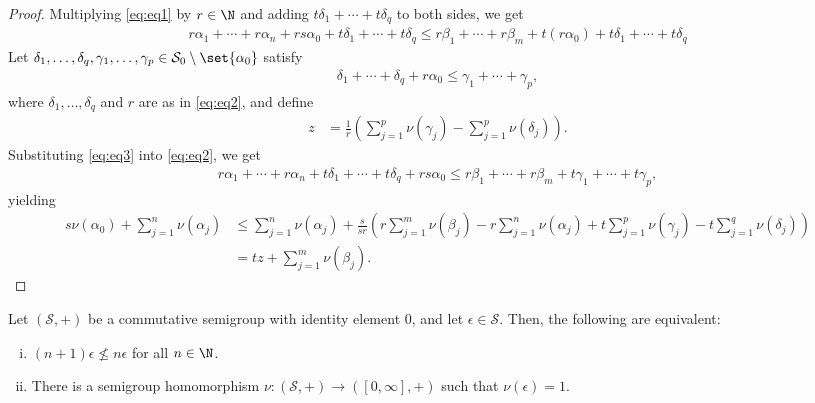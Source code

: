 \documentclass[10pt]{mypackage}
\begin{document}
\begin{proof}
    Multiplying \ref{eq:eq1} by $r\in \N$ and adding $t\delta_1 + \cdots + t\delta_q$ to both sides, we get
    \begin{align*}
      r\alpha_1 + \cdots + r\alpha_n + rs\alpha_0 + t\delta_1 + \cdots + t\delta_q \leq r\beta_1 + \cdots + r\beta_m + t\left(r\alpha_0\right) + t\delta_1 + \cdots + t\delta_q\label{eq:eq2}\tag{\textasteriskcentered\textasteriskcentered}
    \end{align*}
    Let $\delta_1,\dots,\delta_q,\gamma_1,\dots,\gamma_p\in \mathcal{S}_0\setminus \set{\alpha_0}$ satisfy
    \begin{align*}
      \delta_1 +\cdots + \delta_q + r\alpha_0 \leq \gamma_1 + \cdots + \gamma_p, \label{eq:eq3}\tag{\textasteriskcentered\textasteriskcentered\textasteriskcentered}
    \end{align*}
    where $\delta_1,\dots,\delta_q$ and $r$ are as in \ref{eq:eq2}, and define
    \begin{align*}
      z &= \frac{1}{r} \left(\sum_{j=1}^{p}\nu\left(\gamma_j\right) - \sum_{j=1}^{p}\nu\left(\delta_j\right)\right).
    \end{align*}
    Substituting \ref{eq:eq3} into \ref{eq:eq2}, we get
    \begin{align*}
      r\alpha_1 + \cdots + r\alpha_n + t\delta_1 + \cdots + t\delta_q + rs\alpha_0 \leq r\beta_1 + \cdots + r\beta_m + t\gamma_1 + \cdots + t\gamma_p,
    \end{align*}
    yielding
    \begin{align*}
      s\nu\left(\alpha_0\right) + \sum_{j=1}^{n}\nu\left(\alpha_j\right) &\leq \sum_{j=1}^{n}\nu\left(\alpha_j\right) + \frac{s}{sr}\left(r\sum_{j=1}^{m}\nu\left(\beta_j\right) - r\sum_{j=1}^{n}\nu\left(\alpha_j\right) + t\sum_{j=1}^{p}\nu\left(\gamma_j\right) -t\sum_{j=1}^{q}\nu\left(\delta_j\right)\right)\\
                                                                         &= tz + \sum_{j=1}^{m}\nu\left(\beta_j\right).
    \end{align*}
  \end{proof}
  \begin{theorem}
    Let $\left(\mathcal{S},+\right)$ be a commutative semigroup with identity element $0$, and let $\epsilon \in \mathcal{S}$. Then, the following are equivalent:
    \begin{enumerate}[(i)]
      \item $\left(n+1\right)\epsilon \nleq n\epsilon$ for all $n\in \N$.
      \item There is a semigroup homomorphism $\nu: \left(\mathcal{S},+\right)\rightarrow \left([0,\infty],+\right)$ such that $\nu\left(\epsilon\right) = 1$.
    \end{enumerate}
  \end{theorem}
\end{document}
